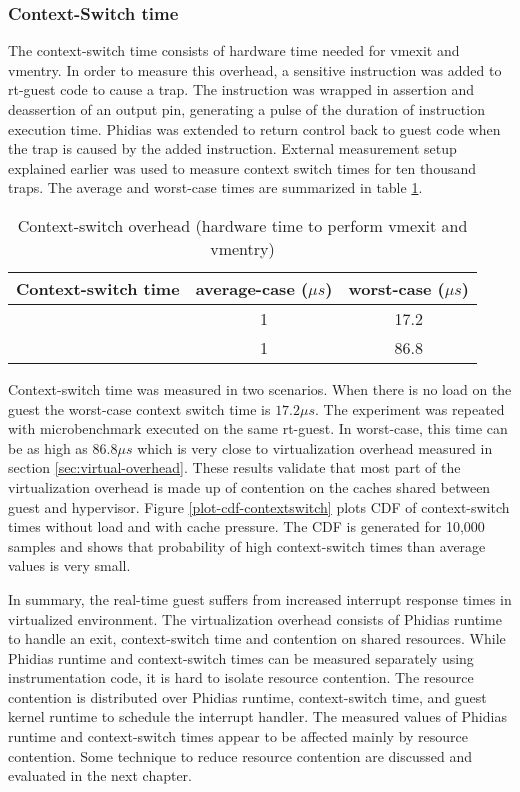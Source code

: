 \subsubsection{Context-Switch time} \label{sec:context-switch-overhead}
The context-switch time consists of hardware time needed for vmexit and vmentry.
In order to measure this overhead, a sensitive instruction was added to rt-guest code to cause a trap. 
The instruction was wrapped in assertion and deassertion of an output pin, generating a pulse of the duration of instruction execution time.
Phidias was extended to return control back to guest code when the trap is caused by the added instruction.
External measurement setup explained earlier was used to measure context switch times for ten thousand traps.
The average and worst-case times are summarized in table \ref{context-switch-time}.

\begin{table}[!h]
\centering
\begin{tabular}{|c||c|c|}  
\hline
	\textbf{Context-switch time}	&	average-case ($\mu{}s$)	&	worst-case ($\mu{}s$) \\ \hline \hline
	\mnoload{}				&	1				&		17.2 \\ \hline
	\mcachepressure{}		&	1				&		86.8 \\ \hline
\end{tabular}
\caption{Context-switch overhead (hardware time to perform vmexit and vmentry)} 
\label{context-switch-time}
\end{table}

Context-switch time was measured in two scenarios. When there is no load on the guest
the worst-case context switch time is $17.2\mu{}s$. 
The experiment was repeated with \mcachepressure{} microbenchmark executed on the same rt-guest.
In worst-case, this time can be as high as $86.8\mu{}s$ which is very close to virtualization overhead measured in section \ref{sec:virtual-overhead}.
These results validate that most part of the virtualization overhead is made up of contention on the caches shared between guest and hypervisor.
Figure \ref{plot-cdf-contextswitch} plots CDF of context-switch times without load and with cache pressure.
The CDF is generated for 10,000 samples and shows that probability of high context-switch times than average values is very small.



In summary, the real-time guest suffers from increased interrupt response times in virtualized environment.
The virtualization overhead consists of Phidias runtime to handle an exit, context-switch time and contention on shared resources. 
While Phidias runtime and context-switch times can be measured separately using instrumentation code, it is hard to isolate resource contention.
The resource contention is distributed over Phidias runtime, context-switch time, and guest kernel runtime to schedule the interrupt handler.
The measured values of Phidias runtime and context-switch times appear to be affected mainly by resource contention.
Some technique to reduce resource contention are discussed and evaluated in the next chapter.


